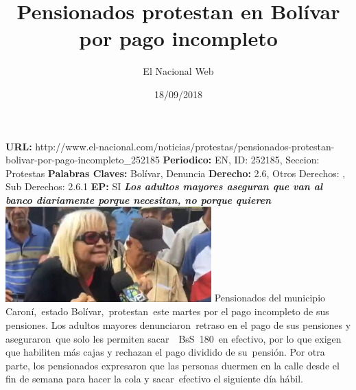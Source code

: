 \documentclass{article}%
\title{\textbf{Pensionados protestan en Bolívar por pago incompleto}}%
\author{El Nacional Web}%
\date{18/09/2018}%
\begin{document}
%
\normalsize%
\maketitle%
\textbf{URL: }%
http://www.el{-}nacional.com/noticias/protestas/pensionados{-}protestan{-}bolivar{-}por{-}pago{-}incompleto\_252185\newline%
%
\textbf{Periodico: }%
EN, %
ID: %
252185, %
Seccion: %
Protestas\newline%
%
\textbf{Palabras Claves: }%
Bolívar, Denuncia\newline%
%
\textbf{Derecho: }%
2.6, %
Otros Derechos: %
, %
Sub Derechos: %
2.6.1\newline%
%
\textbf{EP: }%
SI\newline%
\newline%
%
\textbf{\textit{Los adultos mayores aseguran que van al banco diariamente porque necesitan, no porque quieren}}%
\newline%
\newline%
%
\includegraphics[width=300px]{198.jpg}%
\newline%
%
Pensionados del municipio Caroní,~estado Bolívar,~protestan~este martes por el pago incompleto de sus pensiones.%
\newline%
%
Los adultos mayores denunciaron~retraso en el pago de sus pensiones y aseguraron~que solo les permiten sacar~~BsS~180~en efectivo, por lo que exigen que habiliten más cajas y rechazan el pago dividido de su~pensión.%
\newline%
%
Por otra parte, los pensionados expresaron que las personas duermen en la calle desde el fin de semana para hacer la cola y sacar~efectivo el siguiente día hábil.%
\newline%
%
\end{document}
